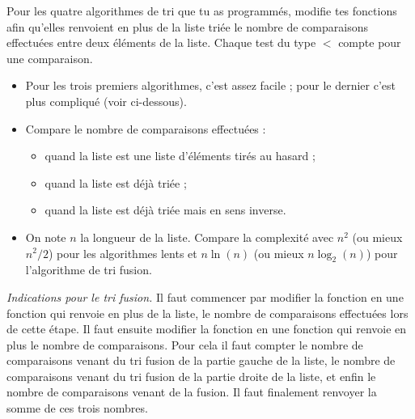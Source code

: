 \documentclass[11pt,class=report,crop=false]{standalone}
\begin{document}
\begin{activite}
	
	
	Pour les quatre algorithmes de tri que tu as programmés, modifie tes fonctions afin qu'elles renvoient en plus de la liste triée le nombre de comparaisons effectuées entre deux éléments de la liste. Chaque test du type \og{} $<$ \fg{} compte pour une comparaison.
	
	\bigskip
	
	\begin{itemize}
		\item Pour les trois premiers algorithmes, c'est assez facile ; pour le dernier c'est plus compliqué (voir ci-dessous).
		\item Compare le nombre de comparaisons effectuées : 
		\begin{itemize}
			\item quand la liste est une liste d'éléments tirés au hasard ; 
			\item quand la liste est déjà triée ;
			\item quand la liste est déjà triée mais en sens inverse.
		\end{itemize}
	\item On note $n$ la longueur de la liste. Compare la complexité avec $n^2$ (ou mieux $n^2/2$) pour les algorithmes lents et $n \ln(n)$ (ou mieux $n\log_2(n)$) pour l'algorithme de tri fusion.
	\end{itemize}

	\bigskip
	
	\emph{Indications pour le tri fusion.}
	Il faut commencer par modifier la fonction  en une fonction  qui renvoie en plus de la liste, le nombre de comparaisons effectuées lors de cette étape.
	Il faut ensuite modifier la fonction  en une fonction  qui renvoie en plus le nombre de comparaisons. Pour cela il faut compter le nombre de comparaisons venant du tri fusion de la partie gauche de la liste, le nombre de comparaisons venant du tri fusion de la partie droite de la liste, et enfin le nombre de comparaisons venant de la fusion. Il faut finalement renvoyer la somme de ces trois nombres.
	
\end{activite}

\bigskip

\end{document}
